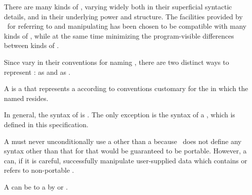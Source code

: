 
There are many kinds of , varying widely both in
their superficial syntactic details, and in their underlying power
and structure.  The facilities provided by \clisp\ for referring to and
manipulating 
has been chosen to be compatible with many kinds of ,
while at the same time minimizing the program-visible differences 
between kinds of .

Since  vary in their conventions for naming ,
there are two distinct ways to represent :
as  and as .


A  is a  that represents a  
according to  conventions customary for the
 in which the named  resides.

In general, the syntax of  is .
The only exception is the syntax of a  ,
which is defined in this specification.

A  must never unconditionally use a
  other than a  
because \clisp\ does not define any  syntax 
other than that for 
that would be guaranteed to be portable.
However, a  can, if it is careful, 
successfully manipulate user-supplied data 
which contains or refers to non-portable .

A  can be  to a  by 
or .

\endSubsection%


%

